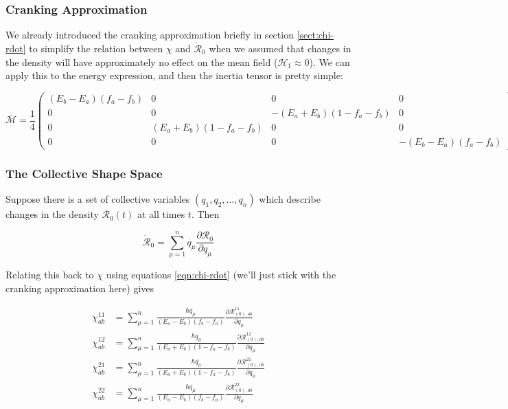 \subsubsection{Cranking Approximation}

We already introduced the cranking approximation briefly in section \ref{sect:chi-rdot} to simplify the relation between $\chi$ and $\mathcal{\dot{R}}_0$ when we assumed that changes in the density will have approximately no effect on the mean field ($\mathcal{H}_1 \approx 0$). We can apply this to the energy expression, and then the inertia tensor is pretty simple:

\begin{equation}
\mathcal{\bar{M}} = \frac{1}{4}\left(\begin{array}{cccc}
(E_b-E_a)(f_a-f_b) & 0                    &                     0 & 0 \\
0                  & 0                    & -(E_a+E_b)(1-f_a-f_b) & 0 \\
0                  & (E_a+E_b)(1-f_a-f_b) & 0                     & 0 \\
0                  & 0                    & 0                     & -(E_b-E_a)(f_a-f_b)
\end{array}\right)
\end{equation}

\subsubsection{The Collective Shape Space}

Suppose there is a set of collective variables $(q_1,q_2,\dots,q_n)$ which describe changes in the density $\mathcal{R}_0(t)$ at all times $t$. Then

\begin{equation*}
\mathcal{\dot{R}}_0 = \sum_{\mu=1}^{n}\dot{q_\mu}\frac{\partial\mathcal{R}_0}{\partial q_\mu}
\end{equation*}

\noindent Relating this back to $\chi$ using equations \ref{eqn:chi-rdot} (we'll just stick with the cranking approximation here) gives

\begin{align*}
\chi^{11}_{ab} &= \sum_{\mu=1}^{n}\frac{\hbar\dot{q_\mu}}{(E_a-E_b)(f_b-f_a)}\frac{\partial\mathcal{R}^{11}_{(0),ab}}{\partial q_\mu} \\
\chi^{12}_{ab} &= \sum_{\mu=1}^{n}\frac{\hbar\dot{q_\mu}}{(E_a+E_b)(1-f_a-f_b)}\frac{\partial\mathcal{R}^{12}_{(0),ab}}{\partial q_\mu} \\
\chi^{21}_{ab} &= \sum_{\mu=1}^{n}\frac{\hbar\dot{q_\mu}}{(E_a+E_b)(1-f_a-f_b)}\frac{\partial\mathcal{R}^{21}_{(0),ab}}{\partial q_\mu} \\
\chi^{22}_{ab} &= \sum_{\mu=1}^{n}\frac{\hbar\dot{q_\mu}}{(E_a-E_b)(f_b-f_a)}\frac{\partial\mathcal{R}^{22}_{(0),ab}}{\partial q_\mu} \\
\end{align*}

